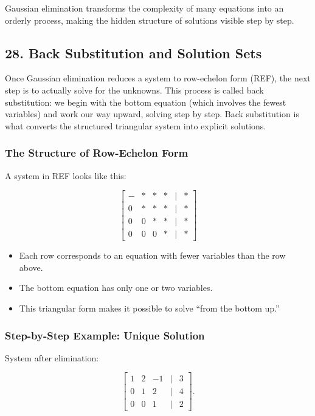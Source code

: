 \documentclass[
  letterpaper,
  DIV=11,
  numbers=noendperiod]{scrreprt}
\providecommand{\tightlist}{%
  \setlength{\itemsep}{0pt}\setlength{\parskip}{0pt}}
\begin{document}
Gaussian elimination transforms the complexity of many equations into an
orderly process, making the hidden structure of solutions visible step
by step.

\subsection{28. Back Substitution and Solution
Sets}\label{back-substitution-and-solution-sets}

Once Gaussian elimination reduces a system to row-echelon form (REF),
the next step is to actually solve for the unknowns. This process is
called back substitution: we begin with the bottom equation (which
involves the fewest variables) and work our way upward, solving step by
step. Back substitution is what converts the structured triangular
system into explicit solutions.

\subsubsection{The Structure of Row-Echelon
Form}\label{the-structure-of-row-echelon-form}

A system in REF looks like this:

\[
\begin{bmatrix}  
- & * & * & * & | & * \\  
0 & * & * & * & | & * \\  
0 & 0 & * & * & | & * \\  
0 & 0 & 0 & * & | & *  
\end{bmatrix}
\]

\begin{itemize}
\tightlist
\item
  Each row corresponds to an equation with fewer variables than the row
  above.
\item
  The bottom equation has only one or two variables.
\item
  This triangular form makes it possible to solve ``from the bottom
  up.''
\end{itemize}

\subsubsection{Step-by-Step Example: Unique
Solution}\label{step-by-step-example-unique-solution}

System after elimination:

\[
\begin{bmatrix}  
1 & 2 & -1 & | & 3 \\  
0 & 1 & 2 & | & 4 \\  
0 & 0 & 1 & | & 2  
\end{bmatrix}.
\]
\end{document}
